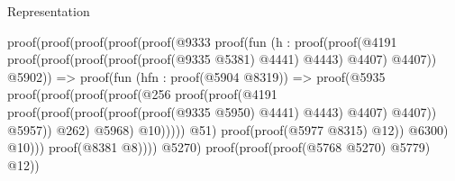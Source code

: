 \begin{lexlean}{Representation}
\begin{coremodule}
                                                  proof(proof(proof(proof(proof(@9333
                                                              proof(fun (h : proof(proof(@4191
                                                                      proof(proof(proof(proof(proof(@9335
                                                                                  @5381)
                                                                                @4441)
                                                                              @4443)
                                                                            @4407)
                                                                          @4407))
                                                                    @5902)) =>
                                                                proof(fun (hfn : proof(@5904
                                                                      @8319)) =>
                                                                  proof(@5935
                                                                      proof(proof(proof(proof(@256
                                                                                proof(proof(@4191
                                                                                      proof(proof(proof(proof(proof(@9335
                                                                                                  @5950)
                                                                                                @4441)
                                                                                              @4443)
                                                                                            @4407)
                                                                                          @4407))
                                                                                    @5957))
                                                                              @262)
                                                                            @5968)
                                                                          @10)))))
                                                            @51)
                                                          proof(proof(@5977 @8315) @12))
                                                        @6300)
                                                      @10)))
                                              proof(@8381 @8))))
                                      @5270)
                                    proof(proof(proof(@5768 @5270) @5779) @12))

\end{coremodule}
\end{lexlean}
